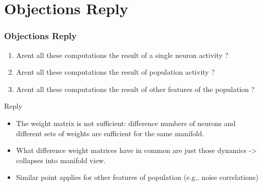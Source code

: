 \documentclass{beamer}
\begin{document}

\section{Objections Reply}
\begin{frame}
\frametitle{\textbf{Objections Reply} }

\begin{enumerate}
    \item Arent all these computations the result of a single neuron activity ?
    \item Arent all these computations the result of population activity ?
    \item Arent all these computations the result of other features of the population ?
\end{enumerate}

Reply

\begin{itemize}
    \item The weight matrix is not sufficient: difference numbers of neurons and different sets of weights are sufficient for the same manifold.
    \item What difference weight matrices have in common are just those dynamics -> collapses into manifold view.
    \item Similar point applies for other features of population (e.g., noise correlations)
\end{itemize}


\end{frame}

\end{document}
